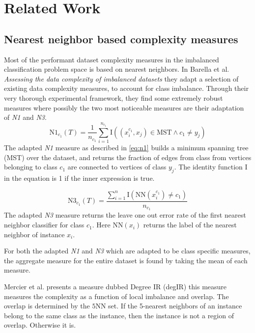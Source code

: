 \section{Related Work}
\subsection*{Nearest neighbor based complexity measures}
Most of the performant dataset complexity measures in the imbalanced classification problem space is based on nearest neighbors. 
In Barella et al. \cite{DBLP:journals/isci/BarellaGSLC21} \emph{Assessing the data complexity of imbalanced datasets} they adapt a selection of existing data complexity measures, to account for class imbalance. Through their very thorough experimental framework, they find some extremely robust measures where possibly the two most noticeable measures are their adaptation of \emph{N1} and \emph{N3}.
\begin{equation}
    \label{eq:n1}
     \text{N1}_{c_1}(T)=\frac{1}{n_{c_{1}}}\sum_{i=1}^{n_{c_{1}}}\text{I}((x_i^{c_1},x_j)\in \text{MST} \wedge c_1 \neq y_j)
\end{equation}
The adapted \emph{N1} measure as described in \ref{eq:n1} builds a minimum spanning tree (MST) over the dataset, and returns the fraction of edges from class from vertices belonging to class $c_1$ are connected  to vertices of class $y_j$. The identity function $\text{I}$ in the equation is 1 if the inner expression is true.

\begin{equation}
    \label{eq:n3}
    \text{N3}_{c_1}(T)=\frac{\sum_{i=1}^{n}\text{I}(\text{NN}(x_i^{c_1}) \neq c_1)}{n_{c_{1}}}
\end{equation} The adapted \emph{N3} measure returns the leave one out error rate of the first nearest neighbor classifier for class $c_1$. Here $\text{NN}(x_i)$ returns the label of the nearest neighbor of instance $x_i$. 

For both the adapted \emph{N1} and \emph{N3} which are adapted to be class specific measures, the aggregate measure for the entire dataset is found by taking the mean of each measure. 

Mercier et al. \cite{DBLP:conf/ida/MercierSASSS18} presents a measure dubbed Degree IR (degIR) this measure measures the complexity as a function of local imbalance and overlap. The overlap is determined by the $5\text{NN}$ set. If the 5-nearest neighbors of an instance belong to the same class as the instance, then the instance is not a region of overlap. Otherwise it is.  

